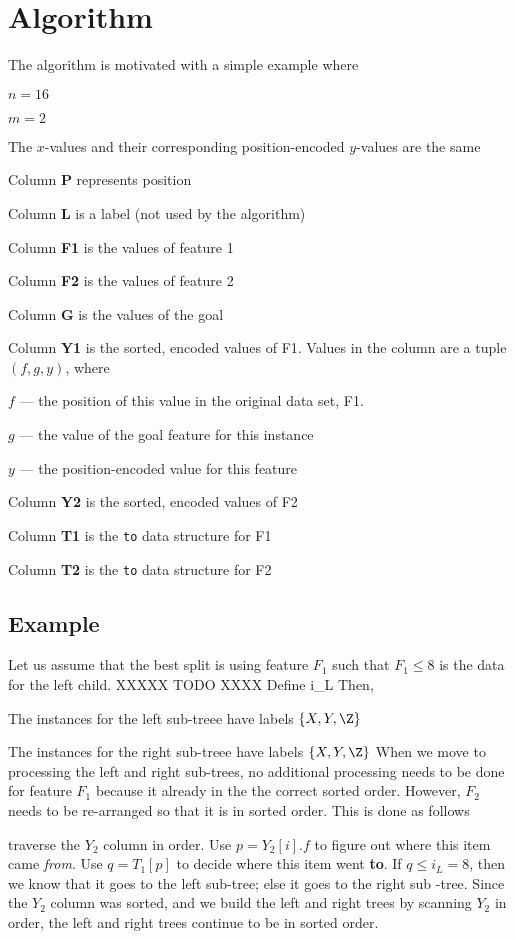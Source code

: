 \documentclass[12pt,letterpaper]{article}
\begin{document}
\section{Algorithm}

The algorithm is motivated with a simple example where
\be
\item \(n= 16\)
\item \(m= 2\)
\item The \(x\)-values and their corresponding position-encoded \(y\)-values are the same
\item Column {\bf P} represents position
\item Column {\bf L} is a label (not used by the algorithm)
\item Column {\bf F1} is the values of feature 1 
\item Column {\bf F2} is the values of feature 2
\item Column {\bf G} is the values of the goal
\item Column {\bf Y1} is the sorted, encoded values of F1. Values in the column
  are a tuple \((f,g,y)\), where 
  \be
\item \(f\) --- the position of this value in the original data set, F1.
\item \(g\) --- the value of the goal feature for this instance
\item \(y\) --- the position-encoded value for this feature
  \ee
\item Column {\bf Y2} is the sorted, encoded values of F2
\item Column {\bf T1} is the {\tt to} data structure for F1
\item Column {\bf T2} is the {\tt to} data structure for F2
  \ee


\subsection{Example}

Let us assume that the best split is using feature \(F_1\) such that \(F_1 \leq
8\) is the data for the left child. XXXXX TODO XXXX Define i_L Then,
\bi
\item The instances for the left sub-treee have labels \(\{X, Y, \Z\}\)
\item The instances for the right sub-treee have labels \(\{X, Y, \Z\}\)
\ei
When we move to processing the left and right sub-trees, no
additional processing needs to be done for feature \(F_1\) because it already in the the correct sorted order. 
However,  \(F_2\) needs to be re-arranged so that it is in sorted order. This is
done as follows
\be
\item traverse the \(Y_2\) column in order. Use \(p = Y_2[i].f\) to figure out where
this item came {\em from}. Use \(q = T_1[p]\) to decide where this item went {\bf
to}. If \(q \leq i_L = 8\), then we know that it goes to the left sub-tree; else
it goes to the right sub -tree. Since the \(Y_2\) column was sorted, and we
build the left and right trees by scanning \(Y_2\) in order, the left
and right trees continue to be in sorted order. 
\end{document}
